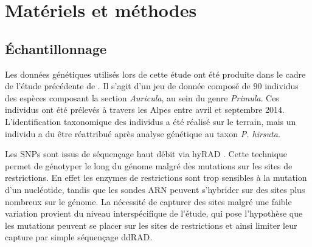 
\section{Matériels et méthodes}

\subsection{Échantillonnage}

Les données génétiques utilisés lors de cette étude ont été produite dans le cadre de l'étude précédente de \citet{Boucher2016a}. 
Il s'agit d'un jeu de donnée composé de 90 individus des espèces composant la section \textit{Auricula}, au sein du genre \textit{Primula}. 
Ces individus ont été prélevés à travers les Alpes entre avril et septembre 2014. 
L'identification taxonomique des individus a été réalisé sur le terrain, mais un individu a du être réattribué après analyse génétique au taxon \textit{P. hirsuta}.

Les SNPs sont issus de séquençage haut débit via hyRAD \citep{Suchan2016}. 
Cette technique permet de génotyper le long du génome malgré des mutations sur les sites de restrictions. 
En effet les enzymes de restrictions sont trop sensibles à la mutation d'un nucléotide, tandis que les sondes ARN peuvent s'hybrider sur des sites plus nombreux sur le génome. 
La nécessité de capturer des sites malgré une faible variation provient du niveau interspécifique de l'étude, qui pose l'hypothèse que les mutations peuvent se placer sur les sites de restrictions et ainsi limiter leur capture par simple séquençage ddRAD.


